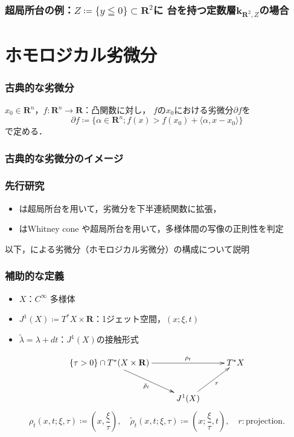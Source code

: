 \documentclass[dvipdfmx,12pt,aspectratio=169,leqno]{beamer}%
\newcommand{\rr}{\mathbf{R}}
\newcommand{\kk}{\mathbf{k}}
\numberwithin{equation}{subsection}
\theoremstyle{mystyle}
\begin{document}
\begin{frame}
    \frametitle{
        超局所台の例：\(Z\coloneqq\{y\leqq0\}\subset\rr^2\)に
        台を持つ定数層\(\kk_{\rr^2,Z}\)の場合}
\end{frame}

\section[ホモロジカル劣微分]{ホモロジカル劣微分}

\begin{frame}
    \frametitle{古典的な劣微分}
    \(x_0\in \rr^n\)，\(f\colon \rr^n\to\rr\)：凸関数に対し，
    \(f\)の\(x_0\)における劣微分\(\partial f\)を
    \[
        \partial f\coloneqq \{
            \alpha\in\rr^n;
            f(x)>f(x_0)+\langle \alpha, x-x_0\rangle
        \}
    \]
    で定める．
\end{frame}\begin{frame}
    \frametitle{古典的な劣微分のイメージ}
\end{frame}
\begin{frame}
    \frametitle{先行研究}
    \begin{itemize}
        \item 
        \cite{Vic13}は超局所台を用いて，劣微分を下半連続関数に拡張，
        \item 
        \cite{Jub13}はWhitney cone や超局所台を用いて，多様体間の写像の正則性を判定
    \end{itemize}
    以下，\cite{Vic13}による劣微分（ホモロジカル劣微分）の構成について説明
\end{frame}


\begin{frame}
    \frametitle{補助的な定義}

    \begin{itemize}
        \item \(X\)：\(C^\infty\) 多様体
        \item \(J^{1}(X)\coloneqq T^{\ast}X\times \rr\)：1ジェット空間，\((x;\xi,t)\)
        \item \(\tilde{\lambda}=\lambda+dt\)：\(J^{1}(X)\)の接触形式
    \end{itemize}
    
    \[
        \vcenter{\xymatrix@C=26pt@R=26pt{
        \left\{\tau>0\right\}\cap T^{\ast}(X\times\rr)
        \ar[rd]_-{\tilde{\rho}_{t}}
        \ar[rr]^-{\rho_{t}}
        &&
        T^{\ast}X
        \\
        &
        J^{1}(X)
        \ar[ru]_-{r}
      }}
    \]
    \[
        \rho_{t}\left(x,t;\xi,\tau\right)
        \coloneqq
        \left(x,\frac{\xi}{\tau}\right),
        \quad
        \tilde{\rho}_{t}\left(x,t;\xi,\tau\right)
        \coloneqq
        \left(x;\frac{\xi}{\tau},t\right),
        \quad
        r\colon\text{projection}.
    \]

\end{frame}
\end{document}
